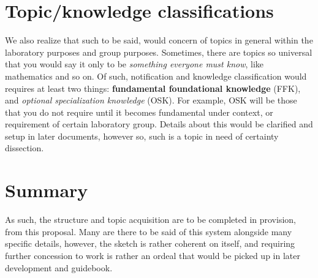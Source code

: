 \documentclass[10pt,a4paper]{article}
\begin{document}
\section{Topic/knowledge classifications}

We also realize that such to be said, would concern of topics in general within the laboratory purposes and group purposes. Sometimes, there are topics so universal that you would say it only to be \textit{something everyone must know}, like mathematics and so on. Of such, notification and knowledge classification would requires at least two things: \textbf{fundamental foundational knowledge} (FFK), and \textit{optional specialization knowledge} (OSK). For example, OSK will be those that you do not require until it becomes fundamental under context, or requirement of certain laboratory group. Details about this would be clarified and setup in later documents, however so, such is a topic in need of certainty dissection. 

\section{Summary}

As such, the structure and topic acquisition are to be completed in provision, from this proposal. Many are there to be said of this system alongside many specific details, however, the sketch is rather coherent on itself, and requiring further concession to work is rather an ordeal that would be picked up in later development and guidebook. 



\end{document}
